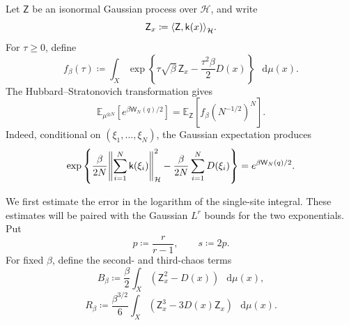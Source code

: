 \documentclass[11pt,reqno]{amsart}
\numberwithin{equation}{section}
\theoremstyle{plain}
\theoremstyle{definition}
\DeclarePairedDelimiter{\norm}{\lVert}{\rVert}
\DeclarePairedDelimiter{\ip}{\langle}{\rangle}
\newcommand{\dd}{\mathop{}\!\mathrm d}
\newcommand{\E}{\mathbb E}
\newcommand{\be}{\beta}
\begin{document}
Let $\mathsf Z$ be an isonormal Gaussian process over $\mathcal H$, and write
\begin{equation}
 \mathsf Z_x\coloneqq\ip*{\mathsf Z,\mathsf k(x)}_{\mathcal H}.
 \label{eq:feature-gaussian-field}
\end{equation}
For $\tau\geq0$, define
\begin{equation}
 f_{\be}(\tau)
 \coloneqq\int_X\exp\left\{
 \tau\sqrt\be\,\mathsf Z_x-\frac{\tau^2\be}{2}D(x)
 \right\}\,\dd\mu(x).
 \label{eq:feature-single-site-transform}
\end{equation}
The Hubbard--Stratonovich transformation gives
\begin{equation}
 \E_{\mu^{\otimes N}}
 \left[e^{\be\mathsf W_N(q)/2}\right]
 =\E_{\mathsf Z}\left[f_{\be}(N^{-1/2})^N\right].
 \label{eq:feature-hubbard-stratonovich}
\end{equation}
Indeed, conditional on $(\xi_1,\ldots,\xi_N)$, the Gaussian expectation produces
\begin{equation}
 \exp\left\{\frac\be{2N}
 \norm*{\sum_{i=1}^N\mathsf k(\xi_i)}_{\mathcal H}^2
 -\frac\be{2N}\sum_{i=1}^ND(\xi_i)\right\}
 =e^{\be\mathsf W_N(q)/2}.
 \label{eq:feature-diagonal-cancellation}
\end{equation}

We first estimate the error in the logarithm of the single-site integral. These estimates will be paired with the Gaussian $L^r$ bounds for the two exponentials. Put
\begin{equation}
 p\coloneqq\frac r{r-1},
 \qquad
 s\coloneqq2p.
 \label{eq:feature-conjugate-exponents}
\end{equation}
For fixed $\be$, define the second- and third-chaos terms
\begin{equation}
 B_{\be}
 \coloneqq\frac\be2\int_X(\mathsf Z_x^2-D(x))\,\dd\mu(x),
 \label{eq:feature-second-chaos}
\end{equation}
\begin{equation}
 R_{\be}
 \coloneqq\frac{\be^{3/2}}6\int_X
 (\mathsf Z_x^3-3D(x)\mathsf Z_x)\,\dd\mu(x).
 \label{eq:feature-third-chaos}
\end{equation}
\end{document}
